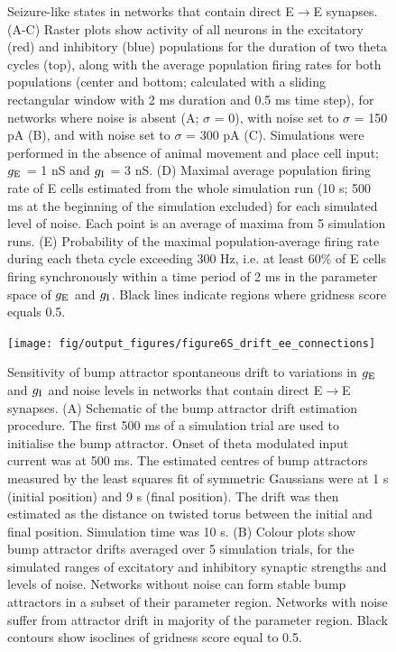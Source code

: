 \documentclass[a4paper,12pt]{article}
\newcommand{\ssc}[3]{\ensuremath{#1_{\text{#2}_{\text{#3}}}}}
\newcommand{\gE      }{\ssc{g}      {\scriptsize{E}}{}}
\newcommand{\gI      }{\ssc{g}      {\scriptsize{I}}{}}
\begin{document}
\begin{figure}[H]
    \internallinenumbers
    \caption{Seizure-like states in networks that contain direct
    E$\rightarrow$E synapses. (A-C) Raster plots show activity of all neurons
    in the excitatory (red) and inhibitory (blue) populations for the duration
    of two theta cycles (top), along with the average population firing rates
    for both populations (center and bottom; calculated with a sliding
    rectangular window with 2 ms duration and 0.5 ms time step), for networks
    where noise is absent (A; $\sigma$ = 0), with noise set to $\sigma$ = 150
    pA (B), and with noise set to $\sigma$ = 300 pA (C). Simulations were
    performed in the absence of animal movement and place cell input; $\gE$ = 1 nS
    and $\gI$ = 3 nS.  (D) Maximal average population firing rate of E cells
    estimated from the whole simulation run (10 s; 500 ms at the beginning of
    the simulation excluded) for each simulated level of noise. Each point is
    an average of maxima from 5 simulation runs.  (E) Probability of the
    maximal population-average firing rate during each theta cycle exceeding
    300 Hz, i.e. at least 60\% of E cells firing synchronously within a time
    period of 2 ms in the parameter space of $\gE$ and $\gI$. Black lines indicate
    regions where gridness score equals 0.5.}
\end{figure}

\clearpage

\begin{figure}[ht!]
    \internallinenumbers
    \centering
        \texttt{[image: fig/output\_figures/figure6S\_drift\_ee\_connections]}
    \caption{Sensitivity of bump attractor spontaneous drift to variations in
    $\gE$ and $\gI$ and noise levels in networks that contain direct
    E$\rightarrow$E synapses. (A) Schematic of the bump attractor drift
    estimation procedure. The first 500 ms of a simulation trial are used to
    initialise the bump attractor. Onset of theta modulated input current was
    at 500 ms.  The estimated centres of bump attractors measured by the least
    squares fit of symmetric Gaussians were at 1 s (initial position) and 9 s
    (final position). The drift was then estimated as the distance on twisted
    torus between the initial and final position. Simulation time was 10 s. (B)
    Colour plots show bump attractor drifts averaged over 5 simulation trials,
    for the simulated ranges of excitatory and inhibitory synaptic strengths
    and levels of noise.  Networks without noise can form stable bump
    attractors in a subset of their parameter region. Networks with noise
    suffer from attractor drift in majority of the parameter region. Black
    contours show isoclines of gridness score equal to 0.5.}
\end{figure}
\end{document}
